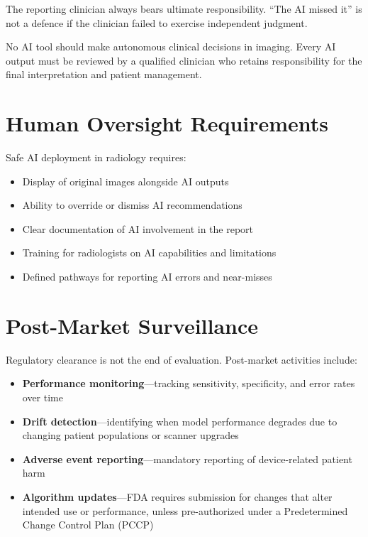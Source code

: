 The reporting clinician always bears ultimate responsibility. ``The AI missed it'' is not a defence if the clinician failed to exercise independent judgment.

\begin{pearlbox}
No AI tool should make autonomous clinical decisions in imaging. Every AI output must be reviewed by a qualified clinician who retains responsibility for the final interpretation and patient management.
\end{pearlbox}

\section{Human Oversight Requirements}
Safe AI deployment in radiology requires:
\begin{itemize}
    \item Display of original images alongside AI outputs
    \item Ability to override or dismiss AI recommendations
    \item Clear documentation of AI involvement in the report
    \item Training for radiologists on AI capabilities and limitations
    \item Defined pathways for reporting AI errors and near-misses
\end{itemize}

\section{Post-Market Surveillance}
Regulatory clearance is not the end of evaluation. Post-market activities include:
\begin{itemize}
    \item \textbf{Performance monitoring}---tracking sensitivity, specificity, and error rates over time
    \item \textbf{Drift detection}---identifying when model performance degrades due to changing patient populations or scanner upgrades
    \item \textbf{Adverse event reporting}---mandatory reporting of device-related patient harm
    \item \textbf{Algorithm updates}---FDA requires submission for changes that alter intended use or performance, unless pre-authorized under a Predetermined Change Control Plan (PCCP)
\end{itemize}

